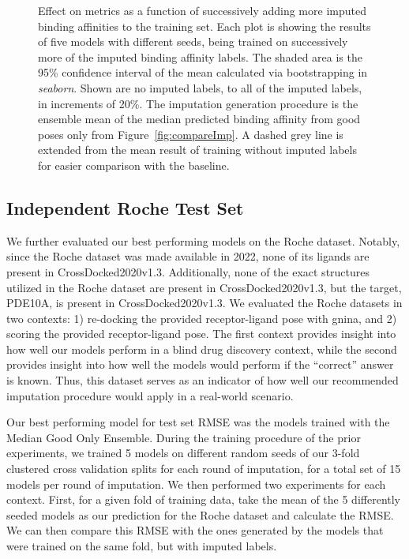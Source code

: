 \documentclass[journal=jcim,manuscript=article]{achemso}
\begin{document}
\begin{figure}[tbph]
    \caption{Effect on metrics as a function of successively adding more imputed binding affinities to the training set. Each plot is showing the results of five models with different seeds, being trained on successively more of the imputed binding affinity labels. The shaded area is the 95\% confidence interval of the mean calculated via bootstrapping in \textit{seaborn}. Shown are no imputed labels, to all of the imputed labels, in increments of 20\%. The imputation generation procedure is the ensemble mean of the median predicted binding affinity from good poses only from Figure~\ref{fig:compareImp}. A dashed grey line is extended from the mean result of training without imputed labels for easier comparison with the baseline.}
    \label{fig:medGOEnsAdding}
\end{figure}

\subsection{Independent Roche Test Set}
We further evaluated our best performing models on the Roche dataset.
Notably, since the Roche dataset was made available in 2022, none of its ligands are present in CrossDocked2020v1.3.
Additionally, none of the exact structures utilized in the Roche dataset are present in CrossDocked2020v1.3, but the target, PDE10A, is present in CrossDocked2020v1.3.
We evaluated the Roche datasets in two contexts: 1) re-docking the provided receptor-ligand pose with gnina, and 2) scoring the provided receptor-ligand pose.
The first context provides insight into how well our models perform in a blind drug discovery context, while the second provides insight into how well the models would perform if the ``correct'' answer is known.
Thus, this dataset serves as an indicator of how well our recommended imputation procedure would apply in a real-world scenario.

Our best performing model for test set RMSE was the models trained with the Median Good Only Ensemble.
During the training procedure of the prior experiments, we trained 5 models on different random seeds of our 3-fold clustered cross validation splits for each round of imputation, for a total set of 15 models per round of imputation.
We then performed two experiments for each context.
First, for a given fold of training data, take the mean of the 5 differently seeded models as our prediction for the Roche dataset and calculate the RMSE.
We can then compare this RMSE with the ones generated by the models that were trained on the same fold, but with imputed labels.
\end{document}

